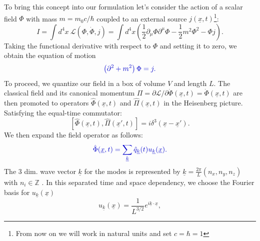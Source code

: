\documentclass[12pt, titlepage]{article}
\begin{document}
To bring this concept into our formulation let's consider 
the action of a scalar field $ \Phi $ with mass $ m=m_{0}c/\hbar $ coupled to an external source $ j(\underline{x},t) $\footnote{From now on we will work in natural units and set $ c=\hbar=1 $ }:
\begin{equation}
I=\int d^{4}x \ \mathcal{L}(\Phi, \dot{\Phi},j)=
\int d^{4}x 
\left(
\frac{1}{2}\partial_{\mu}\Phi\partial^{\mu}\Phi
-\frac{1}{2}m^{2}\Phi^{2}
-\Phi j
 \right)
 .
\end{equation}
Taking the functional derivative with respect to $ \Phi $ and setting it to zero, we obtain the equation of motion
\begin{equation}\label{motion_scalar}
\textcolor[RGB]{0,0,204}{
\left(
\partial^{2}+m^{2}
 \right)\Phi
 =j
 .}
\end{equation}
To proceed, we quantize our field in a box of volume $ V $ and length $ L $. The classical field and its canonical momentum $ \Pi = \partial \mathcal{L} /\partial\dot{\Phi}(\underline{x},t)=\dot{\Phi}(\underline{x},t) $ are then promoted to operators $ \hat{\Phi}(\underline{x},t) $ and  $ \hat{\Pi}(\underline{x},t) $ in the Heisenberg picture. Satisfying the equal-time commutator:
\begin{equation}
\left[
\hat{\Phi}(\underline{x},t),\hat{\Pi}(\underline{x}',t)
 \right] 
 =
 i
 \delta^{3}
 (\underline{x} - \underline{x}')
 .
\end{equation}
We then expand the field operator as follows:
\begin{equation}\label{box_quanta}
\textcolor[RGB]{0,0,204}{
\hat{\Phi} (\underline{x},t)= \sum_{\underline{k}} \hat{q}_{\underline{k}}(t)u_{\underline{k}}(\underline{x})
 .}
\end{equation}
The 3 dim. wave vector $ \underline{k} $ for the modes is represented by $ \underline{k} = \frac{2\pi}{L}(n_{x},n_{y},n_{z}) $ with $ n_{i}\in \mathbb{Z} $ . 
	In this separated time and space dependency, we choose the Fourier basis for $ u_{\underline{k}}(\underline{x}) $
\begin{equation}\label{fourierbasis}
u_{\underline{k}}(\underline{x})
=
\dfrac{1}{L^{3/2}} e^{i\underline{k}\cdot \underline{x}}
,
\end{equation}
\end{document}
